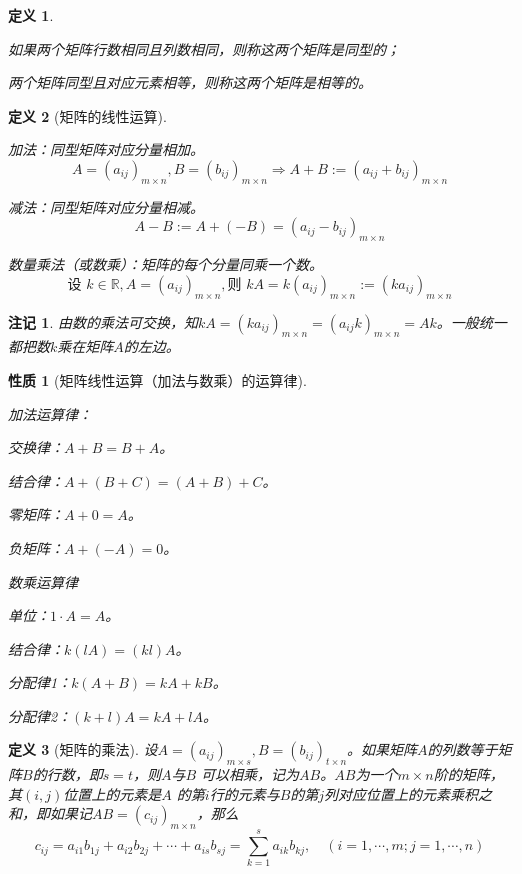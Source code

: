 \documentclass[a4paper]{book}
\newtheorem{prop}{性质}[chapter]
\newtheorem{Def}{定义}[chapter]
\newtheorem{rmk}{注记}[chapter]
\newcommand{\enum}{\begin{list}{}{\setlength{\leftmargin}{0pt} \setlength{\itemindent}{2.5em} \setlength{\listparindent}{2em}}}
\begin{document}
\begin{Def}\

\enum
\item[(1)] 如果两个矩阵行数相同且列数相同，则称这两个矩阵是同型的；
\item[(2)] 两个矩阵同型且对应元素相等，则称这两个矩阵是相等的。
\end{list}
\end{Def}

\begin{Def}[矩阵的线性运算]\

\enum
\item[(1)] 加法：同型矩阵对应分量相加。
$$A = (a_{ij})_{m\times n}, B = (b_{ij})_{m\times n} \Rightarrow A + B := (a_{ij} + b_{ij})_{m\times n}$$
\item[(2)] 减法：同型矩阵对应分量相减。
$$A - B := A + (-B) = (a_{ij} - b_{ij})_{m\times n}$$
\item[(3)] 数量乘法（或数乘）：矩阵的每个分量同乘一个数。
$$\text{设 }k\in\mathbb{R}, A = (a_{ij})_{m\times n}, \text{则 } kA = k(a_{ij})_{m\times n} := (ka_{ij})_{m\times n}$$
\end{list}
\end{Def}

\begin{rmk}
由数的乘法可交换，知$kA = (ka_{ij})_{m\times n} = (a_{ij}k)_{m\times n} = Ak$。一般统一都把数$k$乘在矩阵$A$的左边。
\end{rmk}

\begin{prop}[矩阵线性运算（加法与数乘）的运算律]\

加法运算律：
\enum
\item[(1)] 交换律：$A+B = B+A$。
\item[(2)] 结合律：$A+(B+C) = (A+B)+C$。
\item[(3)] 零矩阵：$A+0 = A$。
\item[(4)] 负矩阵：$A+(-A) = 0$。
\end{list}

数乘运算律
\enum
\item[(5)] 单位：$1\cdot A = A$。
\item[(6)] 结合律：$k(lA) = (kl)A$。
\item[(7)] 分配律1：$k(A+B) = kA+kB$。
\item[(8)] 分配律2：$(k+l)A = kA+lA$。
\end{list}
\end{prop}

\begin{Def}[矩阵的乘法]
设$A = (a_{ij})_{m\times s}, B = (b_{ij})_{t\times n}$。如果矩阵$A$的列数等于矩阵$B$的行数，即$s=t$，则$A$与$B$ 可以相乘，记为$AB$。$AB$为一个$m\times n$阶的矩阵，其$(i,j)$位置上的元素是$A$ 的第$i$行的元素与$B$的第$j$列对应位置上的元素乘积之和，即如果记$AB = (c_{ij})_{m\times n}$，那么
$$c_{ij} = a_{i1}b_{1j} + a_{i2}b_{2j} + \cdots + a_{is}b_{sj} = \sum\limits_{k=1}^s a_{ik}b_{kj}, \quad (i=1,\cdots,m; j=1,\cdots,n)$$
\end{Def}
\end{document}
